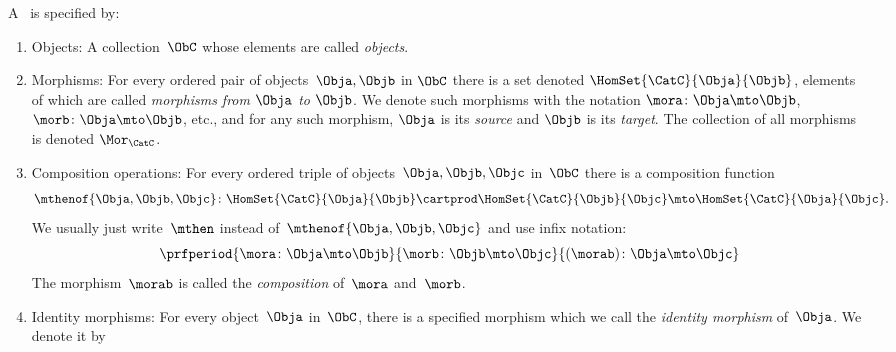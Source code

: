 \begin{ctdefinition}[Category]
    \label{def:categorymain}
    A ~\CatC is specified by:
    \begin{body}
        \constit
        \begin{enumerate}
            \item \label{category-objects}
                  Objects: A collection~$\ObC$ whose elements are called \emph{objects}.
            \item \label{category-morphisms}
                  Morphisms: For every ordered pair of objects~$\Obja,\Objb$ in $\ObC$ there is a set denoted $\HomSet{\CatC}{\Obja}{\Objb}$, elements of which are called \emph{morphisms from $\Obja$ to $\Objb$}. We denote such morphisms with the notation $\mora \colon \Obja \mto \Objb$, $\morb \colon \Obja \mto \Objb$, etc., and for any such morphism, $\Obja$ is its \emph{source} and $\Objb$ is its \emph{target}. The collection of all morphisms is denoted $\Mor_{\CatC}$. 
            \item \label{category-composition}
                  Composition operations: For every ordered triple of objects~$\Obja,\Objb,\Objc$ in~$\ObC$ there is a composition function
                  \begin{equation}\label{eq:category-composition}
                      \mthenof{\Obja,\Objb,\Objc}\colon \HomSet{\CatC}{\Obja}{\Objb} \cartprod \HomSet{\CatC}{\Objb}{\Objc}\mto \HomSet{\CatC}{\Obja}{\Objc}.
                  \end{equation}
                  We usually just write~$\mthen$ instead of~$\mthenof{\Obja,\Objb,\Objc}$ and use infix notation:
                  \begin{equation}
                      \prfperiod{
                          \mora \colon \Obja \mto \Objb
                      }{
                          \morb\colon \Objb \mto \Objc
                      }{
                          (\morab )\colon \Obja \mto \Objc
                      }
                  \end{equation}
                  The morphism~$\morab$ is called the \emph{composition} of~$\mora$ and~$\morb$.
            \item \label{category-identities}
                  Identity morphisms: For every object~$\Obja$ in~$\ObC$, there is a specified morphism which we call the \emph{identity morphism} of~$\Obja$. We denote it by
                  \begin{equation}\label{eq:category-identity}

\end{equation}
\end{enumerate}
\end{body}
\end{ctdefinition}
